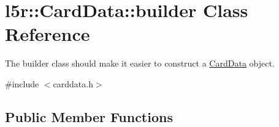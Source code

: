 \hypertarget{classl5r_1_1CardData_1_1builder}{}\section{l5r\+:\+:Card\+Data\+:\+:builder Class Reference}
\label{classl5r_1_1CardData_1_1builder}


The builder class should make it easier to construct a \hyperlink{classl5r_1_1CardData}{Card\+Data} object.  




{\ttfamily \#include $<$carddata.\+h$>$}

\subsection*{Public Member Functions}
